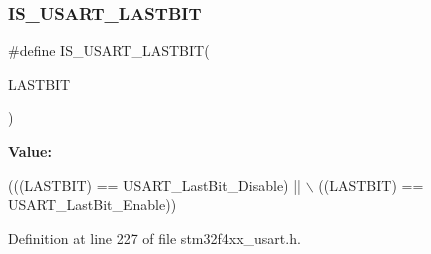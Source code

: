 \subsubsection{\texorpdfstring{I\+S\+\_\+\+U\+S\+A\+R\+T\+\_\+\+L\+A\+S\+T\+B\+IT}{IS\_USART\_LASTBIT}}
{\footnotesize\ttfamily \#define I\+S\+\_\+\+U\+S\+A\+R\+T\+\_\+\+L\+A\+S\+T\+B\+IT(\begin{DoxyParamCaption}\item[{}]{L\+A\+S\+T\+B\+IT }\end{DoxyParamCaption})}

{\bfseries Value\+:}
\begin{DoxyCode}
(((LASTBIT) == USART\_LastBit\_Disable) || \(\backslash\)
                                   ((LASTBIT) == USART\_LastBit\_Enable))
\end{DoxyCode}


Definition at line 227 of file stm32f4xx\+\_\+usart.\+h.

